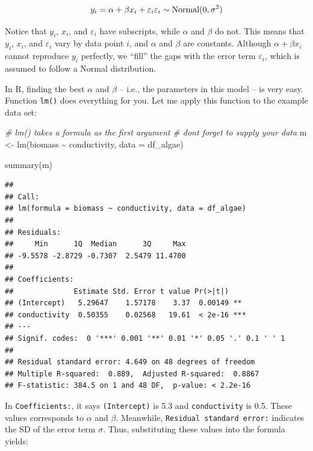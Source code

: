 \documentclass[
]{article}
\newenvironment{Shaded}{\begin{snugshade}}{\end{snugshade}}
\newcommand{\AttributeTok}[1]{\textcolor[rgb]{0.77,0.63,0.00}{#1}}
\newcommand{\CommentTok}[1]{\textcolor[rgb]{0.56,0.35,0.01}{\textit{#1}}}
\newcommand{\FunctionTok}[1]{\textcolor[rgb]{0.00,0.00,0.00}{#1}}
\newcommand{\NormalTok}[1]{#1}
\newcommand{\OtherTok}[1]{\textcolor[rgb]{0.56,0.35,0.01}{#1}}
\newcommand{\SpecialCharTok}[1]{\textcolor[rgb]{0.00,0.00,0.00}{#1}}
\begin{document}
\[
y_i = \alpha + \beta x_i + \varepsilon_i\\
\varepsilon_i \sim \text{Normal}(0, \sigma^2)
\]

Notice that \(y_i\), \(x_i\), and \(\varepsilon_i\) have subscripts, while \(\alpha\) and \(\beta\) do not. This means that \(y_i\), \(x_i\), and \(\varepsilon_i\) vary by data point \(i\), and \(\alpha\) and \(\beta\) are constants. Although \(\alpha + \beta x_i\) cannot reproduce \(y_i\) perfectly, we ``fill'' the gaps with the error term \(\varepsilon_i\), which is assumed to follow a Normal distribution.

In R, finding the best \(\alpha\) and \(\beta\) -- i.e., the parameters in this model -- is very easy. Function \texttt{lm()} does everything for you. Let me apply this function to the example data set:

\begin{Shaded}
\begin{Highlighting}[]
\CommentTok{\# lm() takes a formula as the first argument}
\CommentTok{\# don\textquotesingle{}t forget to supply your data}
\NormalTok{m }\OtherTok{\textless{}{-}} \FunctionTok{lm}\NormalTok{(biomass }\SpecialCharTok{\textasciitilde{}}\NormalTok{ conductivity,}
        \AttributeTok{data =}\NormalTok{ df\_algae)}

\FunctionTok{summary}\NormalTok{(m)}
\end{Highlighting}
\end{Shaded}

\begin{verbatim}
## 
## Call:
## lm(formula = biomass ~ conductivity, data = df_algae)
## 
## Residuals:
##     Min      1Q  Median      3Q     Max 
## -9.5578 -2.8729 -0.7307  2.5479 11.4700 
## 
## Coefficients:
##              Estimate Std. Error t value Pr(>|t|)    
## (Intercept)   5.29647    1.57178    3.37  0.00149 ** 
## conductivity  0.50355    0.02568   19.61  < 2e-16 ***
## ---
## Signif. codes:  0 '***' 0.001 '**' 0.01 '*' 0.05 '.' 0.1 ' ' 1
## 
## Residual standard error: 4.649 on 48 degrees of freedom
## Multiple R-squared:  0.889,  Adjusted R-squared:  0.8867 
## F-statistic: 384.5 on 1 and 48 DF,  p-value: < 2.2e-16
\end{verbatim}

In \texttt{Coefficients:}, it says \texttt{(Intercept)} is 5.3 and \texttt{conductivity} is 0.5. These values corresponds to \(\alpha\) and \(\beta\). Meanwhile, \texttt{Residual\ standard\ error:} indicates the SD of the error term \(\sigma\). Thus, substituting these values into the formula yields:
\end{document}
